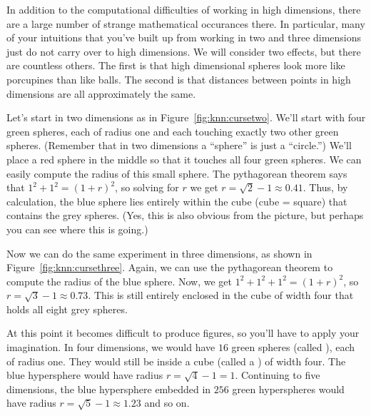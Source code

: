 
In addition to the computational difficulties of working in high
dimensions, there are a large number of strange mathematical
occurances there.  In particular, many of your intuitions that you've
built up from working in two and three dimensions just do not carry
over to high dimensions.  We will consider two effects, but there are
countless others.  The first is that high dimensional spheres look
more like porcupines than like balls.
The second is that distances between points in high dimensions are all
approximately the same.


Let's start in two dimensions as in Figure~\ref{fig:knn:cursetwo}.
We'll start with four green spheres, each of radius one and each
touching exactly two other green spheres.  (Remember that in two
dimensions a ``sphere'' is just a ``circle.'')  We'll place a red
sphere in the middle so that it touches all four green spheres.  We
can easily compute the radius of this small sphere.  The pythagorean
theorem says that $1^2 + 1^2 = (1+r)^2$, so solving for $r$ we get $r
= \sqrt 2 - 1 \approx 0.41$.  Thus, by calculation, the blue sphere
lies entirely within the cube (cube = square) that contains the grey
spheres.  (Yes, this is also obvious from the picture, but perhaps you
can see where this is going.)


Now we can do the same experiment in three dimensions, as shown in
Figure~\ref{fig:knn:cursethree}.  Again, we can use the pythagorean
theorem to compute the radius of the blue sphere.  Now, we get $1^2 +
1^2 + 1^2 = (1+r)^2$, so $r = \sqrt3 - 1 \approx 0.73$.  This is still
entirely enclosed in the cube of width four that holds all eight grey
spheres.

At this point it becomes difficult to produce figures, so you'll have
to apply your imagination.  In four dimensions, we would have $16$
green spheres (called ), each of radius one.
They would still be inside a cube (called a ) of
width four.  The blue hypersphere would have radius $r = \sqrt4 - 1 =
1$.  Continuing to five dimensions, the blue hypersphere embedded in
$256$ green hyperspheres would have radius $r = \sqrt5-1 \approx 1.23$
and so on.

